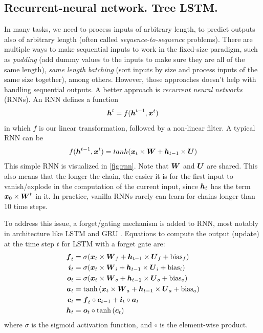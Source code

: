 \subsection{Recurrent-neural network. Tree LSTM.}
In many tasks, we need to process inputs of arbitrary length, to predict outputs also of arbitrary length (often called \emph{sequence-to-sequence} problems). There are multiple ways to make sequential inputs to work in the fixed-size paradigm, such as \emph{padding} (add dummy values to the inputs to make sure they are all of the same length), \emph{same length batching} (sort inputs by size and process inputs of the same size together), among others. However, those approaches doesn't help with handling sequential outputs. A better approach is \emph{recurrent neural networks} (RNNs). An RNN defines a function
\begin{align}
\boldsymbol{h}^t = f(\boldsymbol{h}^{t-1}, \boldsymbol{x}^{t})
\end{align}
in which $f$ is our linear transformation, followed by a non-linear filter. A
typical RNN can be
\begin{align}
  f(\boldsymbol{h}^{t-1}, \boldsymbol{x}^t) = tanh(\boldsymbol{x}_t \times \boldsymbol{W} + \boldsymbol{h}_{t-1} \times \boldsymbol{U} )
\end{align}
This simple RNN is visualized in \cref{fig:rnn}. Note that $\boldsymbol{W}$ and
$\boldsymbol{U}$ are shared. This also means that the longer the chain, the easier it
is for the first input to vanish/explode in the computation of the current
input, since $\boldsymbol{h}_t$ has the term $\boldsymbol{x}_0\times\boldsymbol{W}^t$ in it.
In practice, vanilla RNNs rarely can learn for chains longer than 10 time steps.

To address this issue, a forget/gating mechanism is added to RNN, most notably
in architecture like LSTM \cite{lstm} and GRU \cite{gru}. Equations to compute
the output (update) at the time step $t$  for LSTM
with a forget gate are:
\begin{align}
  \boldsymbol{f}_t &= \sigma(\boldsymbol{x}_t \times \boldsymbol{W}_f + \boldsymbol{h}_{t-1} \times \boldsymbol{U}_f + \text{bias}_f)\\
  \boldsymbol{i}_t &= \sigma(\boldsymbol{x}_t \times \boldsymbol{W}_i + \boldsymbol{h}_{t-1} \times \boldsymbol{U}_i + \text{bias}_i)\\
  \boldsymbol{o}_t &= \sigma(\boldsymbol{x}_t \times \boldsymbol{W}_o + \boldsymbol{h}_{t-1} \times \boldsymbol{U}_o + \text{bias}_o)\\
  \boldsymbol{a}_t &= \tanh{(\boldsymbol{x}_t \times \boldsymbol{W}_a + \boldsymbol{h}_{t-1} \times \boldsymbol{U}_a + \text{bias}_a)}\\
  \boldsymbol{c}_t &= \boldsymbol{f}_t \circ \boldsymbol{c}_{t-1} + \boldsymbol{i}_t \circ \boldsymbol{a}_t \\
  \boldsymbol{h}_t &= \boldsymbol{o}_t \circ \tanh{(\boldsymbol{c}_t)}
\end{align}
where $\sigma$ is the sigmoid activation function, and $\circ$ is the
element-wise product.

